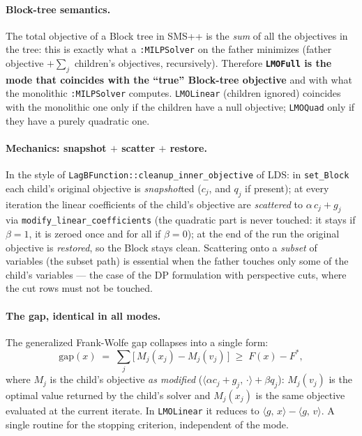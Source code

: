 \documentclass[11pt,a4paper]{article}
\newcommand{\ip}[2]{\langle #1,\, #2\rangle}
\newcommand{\code}[1]{\texttt{#1}}
\theoremstyle{plain}
\theoremstyle{remark}
\begin{document}
\paragraph{Block-tree semantics.} The total objective of a Block tree in SMS++ is
the \emph{sum} of all the objectives in the tree: this is exactly what a
\code{:MILPSolver} on the father minimizes (father objective $+\sum_j$ children's
objectives, recursively). Therefore \textbf{\code{LMOFull} is the mode that
coincides with the ``true'' Block-tree objective} and with what the monolithic
\code{:MILPSolver} computes. \code{LMOLinear} (children ignored) coincides with
the monolithic one only if the children have a null objective; \code{LMOQuad}
only if they have a purely quadratic one.

\paragraph{Mechanics: snapshot $+$ scatter $+$ restore.}
In the style of \code{LagBFunction::cleanup\_inner\_objective} of LDS: in
\code{set\_Block} each child's original objective is \emph{snapshot}ted ($c_j$,
and $q_j$ if present); at every iteration the linear coefficients of the child's
objective are \emph{scattered} to $\alpha\,c_j+g_j$ via
\code{modify\_linear\_coefficients} (the quadratic part is never touched: it stays
if $\beta=1$, it is zeroed once and for all if $\beta=0$); at the end of the run
the original objective is \emph{restored}, so the Block stays clean. Scattering
onto a \emph{subset} of variables (the subset path) is essential when the father
touches only some of the child's variables --- the case of the DP formulation
with perspective cuts, where the cut rows must not be touched.

\paragraph{The gap, identical in all modes.}
The generalized Frank-Wolfe gap collapses into a single form:
\begin{equation}\label{eq:gap}
  \mathrm{gap}(x) \;=\; \sum_j \big[\, M_j(x_j) - M_j(v_j) \,\big] \;\geq\; F(x)-F^*,
\end{equation}
where $M_j$ is the child's objective \emph{as modified} ($\ip{\alpha c_j+g_j}{\cdot}
+\beta q_j$): $M_j(v_j)$ is the optimal value returned by the child's solver and
$M_j(x_j)$ is the same objective evaluated at the current iterate. In
\code{LMOLinear} it reduces to $\ip{g}{x}-\ip{g}{v}$. A single routine for the
stopping criterion, independent of the mode.
\end{document}
